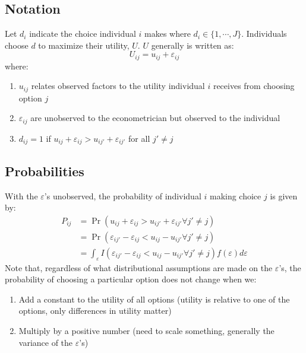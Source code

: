 \documentclass[]{book}
\begin{document}
\subsection{Notation}\label{notation}

Let $d_i$ indicate the choice individual $i$ makes where
$d_i\in\{1,\cdots, J\}$. Individuals choose $d$ to maximize their
utility, $U$. $U$ generally is written as:
\[U_{ij}=u_{ij}+\varepsilon_{ij}\] where:

\begin{enumerate}
\def\labelenumi{\arabic{enumi}.}
\item
  $u_{ij}$ relates observed factors to the utility individual $i$
  receives from choosing option $j$
\item
  $\varepsilon_{ij}$ are unobserved to the econometrician but observed
  to the individual
\item
  $d_{ij}=1$ if $u_{ij}+\varepsilon_{ij}>u_{ij'}+\varepsilon_{ij'}$ for
  all $j'\neq j$
\end{enumerate}

\subsection{Probabilities}\label{probabilities}

With the $\varepsilon$'s unobserved, the probability of individual $i$
making choice $j$ is given by: \[\begin{aligned}
P_{ij}&=\Pr(u_{ij}+\varepsilon_{ij}>u_{ij'}+\varepsilon_{ij'}\forall j'\neq j)\\
&=\Pr(\varepsilon_{ij'}-\varepsilon_{ij}<u_{ij}-u_{ij'}\forall j'\neq j)\\
&=\int_{\varepsilon}I(\varepsilon_{ij'}-\varepsilon_{ij}<u_{ij}-u_{ij'}\forall j'\neq j)f(\varepsilon)d\varepsilon\end{aligned}\]
Note that, regardless of what distributional assumptions are made on the
$\varepsilon$'s, the probability of choosing a particular option does
not change when we:

\begin{enumerate}
\def\labelenumi{\arabic{enumi}.}
\item
  Add a constant to the utility of all options (utility is relative to
  one of the options, only differences in utility matter)
\item
  Multiply by a positive number (need to scale something, generally the
  variance of the $\varepsilon$'s)
\end{enumerate}
\end{document}
